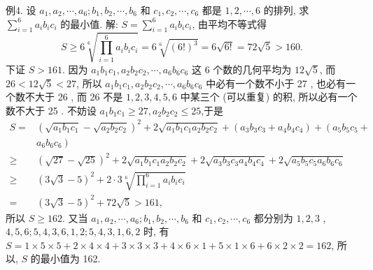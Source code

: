 例4. 设 $a_1, a_2, \cdots, a_6 ; b_1, b_2, \cdots, b_6$ 和 $c_1, c_2, \cdots, c_6$ 都是 $1,2, \cdots, 6$ 的排列, 求 $\sum_{i=1}^6 a_i b_i c_i$ 的最小值.
解: $S=\sum_{i=1}^6 a_i b_i c_i$, 由平均不等式得
$$
S \geqslant 6 \sqrt[6]{\prod_{i=1}^6 a_i b_i c_i}=6 \sqrt[6]{(6 !)^3}=6 \sqrt{6 !}=72 \sqrt{5}>160 .
$$
下证 $S>161$.
因为 $a_1 b_1 c_1, a_2 b_2 c_2, \cdots, a_6 b_6 c_6$ 这 6 个数的几何平均为 $12 \sqrt{5}$, 而 $26< 12 \sqrt{5}<27$, 所以 $a_1 b_1 c_1, a_2 b_2 c_2, \cdots, a_6 b_6 c_6$ 中必有一个数不小于 27 , 也必有一个数不大于 26 , 而 26 不是 $1,2,3,4,5,6$ 中某三个 (可以重复) 的积, 所以必有一个数不大于 25 .
不妨设 $a_1 b_1 c_1 \geqslant 27, a_2 b_2 c_2 \leqslant 25$,于是
$$
\begin{aligned}
S= & \left(\sqrt{a_1 b_1 c_1}-\sqrt{a_2 b_2 c_2}\right)^2+2 \sqrt{a_1 b_1 c_1 a_2 b_2 c_2}+\left(a_3 b_3 c_3+a_4 b_4 c_4\right)+\left(a_5 b_5 c_5+\right. \\
& \left.a_6 b_6 c_6\right) \\
\geqslant & (\sqrt{27}-\sqrt{25})^2+2 \sqrt{a_1 b_1 c_1 a_2 b_2 c_2}+2 \sqrt{a_3 b_3 c_3 a_4 b_4 c_4}+2 \sqrt{a_5 b_5 c_5 a_6 b_6 c_6} \\
\geqslant & (3 \sqrt{3}-5)^2+2 \cdot 3 \sqrt[6]{\prod_{i=1}^6 a_i b_i c_i} \\
= & (3 \sqrt{3}-5)^2+72 \sqrt{5}>161,
\end{aligned}
$$
所以 $S \geqslant 162$.
又当 $a_1, a_2, \cdots, a_6 ; b_1, b_2, \cdots, b_6$ 和 $c_1, c_2, \cdots, c_6$ 都分别为 $1,2,3$ , $4,5,6 ; 5,4,3,6,1,2 ; 5,4,3,1,6,2$ 时, 有 $S=1 \times 5 \times 5+2 \times 4 \times 4+3 \times 3 \times 3+4 \times 6 \times 1+5 \times 1 \times 6+6 \times 2 \times 2=162$, 所以, $S$ 的最小值为 162.



